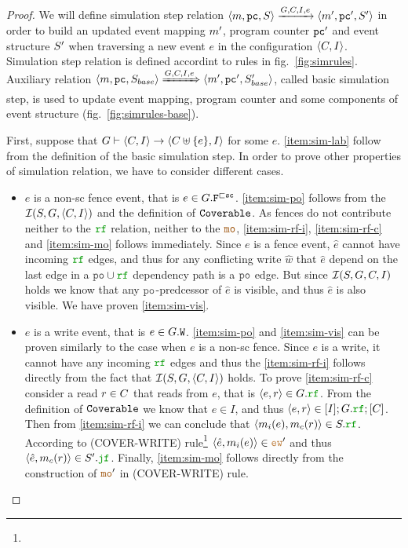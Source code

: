 \documentclass[12pt]{article}
\begin{document}
\begin{proof}
  We will define simulation step relation 
  $\langle m, {\mathtt{pc}}, S \rangle \xrightarrow{G, C, I, e} \langle m', {\mathtt{pc}}', S' \rangle$
  in order to build an updated event mapping $m'$, program counter ${\mathtt{pc}}'$ 
  and event structure $S'$ 
  when traversing a new event $e$ in the configuration $\langle C, I \rangle$.
  Simulation step relation is defined accordint to rules in fig.~\ref{fig:simrules}.
  Auxiliary relation 
  $\langle m, {\mathtt{pc}}, S_{base} \rangle \xRightarrow{G, C, I, e} \langle m', {\mathtt{pc}}', S'_{base} \rangle$,
  called basic simulation step, 
  is used to update event mapping, program counter and some components of event structure
  (fig.~\ref{fig:simrules-base}).

  First, suppose that 
  $G \vdash \langle C, I \rangle \rightarrow \langle C \uplus \{e\}, I \rangle$ for some $e$.
  \ref{item:sim-lab} follow from the definition of the basic simulation step.
  In order to prove other properties of simulation relation,
  we have to consider different cases.

  \begin{itemize}
    \item $e$ is a non-sc fence event, that is $e \in G.{\mathtt{F}}^{\sqsubset{\mathtt{sc}}}$.
      \ref{item:sim-po} follows from the $\mathcal{I}(S, G, \langle C, I \rangle)$ 
      and the definition of ${\mathtt{Coverable}}$.
      As fences do not contribute neither to the $\lRF$ relation, neither to the $\lMO$, 
      \ref{item:sim-rf-i}, \ref{item:sim-rf-c} and \ref{item:sim-mo} follows immediately.
      Since $e$ is a fence event, $\hat{e}$ cannot have incoming $\lRF$ edges,
      and thus for any conflicting write $\hat{w}$ that $\hat{e}$ depend on
      the last edge in a $\lPO \cup \lRF$ dependency path is a $\lPO$ edge.
      But since $\mathcal{I}(S, G, C, I)$ holds we know that 
      any $\lPO$-predcessor of $\hat{e}$ is visible, and thus $\hat{e}$ is also visible.
      We have proven \ref{item:sim-vis}.

    \item $e$ is a write event, that is $e \in G.{\mathtt{W}}$.
      \ref{item:sim-po} and \ref{item:sim-vis} can be proven similarly 
      to the case when $e$ is a non-sc fence.
      Since $e$ is a write, it cannot have any incoming $\lRF$ edges and thus
      the \ref{item:sim-rf-i} follows directly from 
      the fact that $\mathcal{I}(S, G, \langle C, I \rangle)$ holds.
      To prove \ref{item:sim-rf-c} consider a read $r \in C$ that reads from $e$,
      that is $\tup{e, r} \in \lG.\lRF$.
      From the definition of ${\mathtt{Coverable}}$ we know that $e \in I$,
      and thus $\tup{e, r} \in [\lI];\lG.\lRF;[\lC]$.
      Then from \ref{item:sim-rf-i} we can conclude that $\tup{\lMI(e), \lMC(r)} \in \lES.\lRF$.
      According to (COVER-WRITE) rule\footnote{}
      $\tup{\hat{e}, \lMI(e)} \in \lEW'$
      and thus $\tup{\hat{e}, \lMC(r)} \in \lES'.\lJF$.
      Finally, \ref{item:sim-mo} follows directly from the
      construction of $\lMO'$ in (COVER-WRITE) rule.
      

\end{itemize}
\end{proof}
\end{document}
